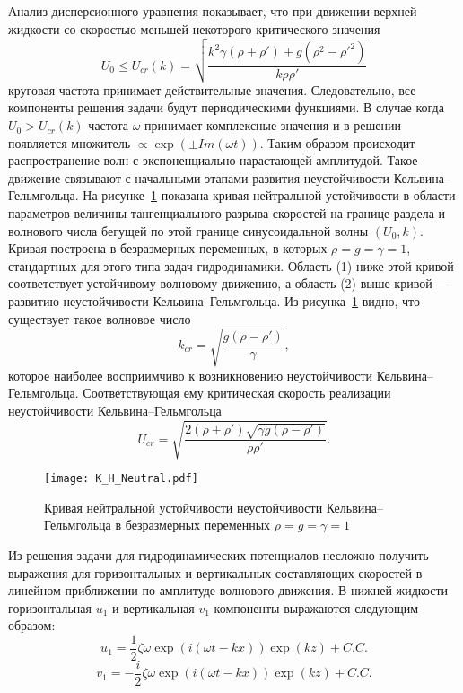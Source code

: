 Анализ дисперсионного уравнения показывает, что при движении верхней жидкости со скоростью меньшей некоторого критического значения \[U_{0}\leq U_{cr}\left( k \right)=\sqrt{\dfrac{k^{2} \gamma \left( \rho+\rho' \right) +g \left( \rho^{2}-\rho'^{2} \right)}{k \rho \rho'}}\] круговая частота  принимает действительные значения. Следовательно, все компоненты решения задачи будут периодическими функциями. В случае когда $ U_{0}>U_{cr}\left( k \right) $ частота $ \omega $ принимает комплексные значения и в решении появляется множитель $ \propto\exp \left( \pm Im\left( \omega t \right) \right) $. Таким образом происходит распространение волн с экспоненциально нарастающей амплитудой. Такое движение связывают с начальными этапами развития неустойчивости Кельвина--Гельмгольца. На рисунке~\ref{fig:K_H_Neutral} показана кривая нейтральной устойчивости в области параметров величины тангенциального разрыва скоростей на границе раздела и волнового числа бегущей по этой границе синусоидальной волны $ \left( U_{0}, k \right) $. Кривая построена в безразмерных переменных, в которых $ \rho=g=\gamma=1 $, стандартных для этого типа задач гидродинамики. Область (1) ниже этой кривой соответствует устойчивому волновому движению, а область (2) выше кривой --- развитию неустойчивости Кельвина--Гельмгольца. Из рисунка~\ref{fig:K_H_Neutral} видно, что существует такое волновое число \[k_{cr}=\sqrt{\dfrac{g \left( \rho - \rho' \right)}{\gamma}},\] которое наиболее восприимчиво к возникновению неустойчивости Кельвина--Гельмгольца. Соответствующая ему критическая скорость реализации неустойчивости Кельвина--Гельмгольца
\begin{equation}
U_{cr}=\sqrt{\dfrac{2 \left( \rho + \rho' \right) \sqrt{\gamma g \left( \rho - \rho' \right)}}{\rho \rho'}}.
\label{Ucrit}
\end{equation}

\begin{figure}[ht]
\centering
\texttt{[image: K\_H\_Neutral.pdf]}
\caption{Кривая нейтральной устойчивости неустойчивости Кельвина--Гельмгольца в безразмерных переменных $ \rho=g=\gamma=1 $}\label{fig:K_H_Neutral}
\end{figure}

Из решения задачи для гидродинамических потенциалов несложно получить выражения для горизонтальных и вертикальных составляющих скоростей в линейном приближении по амплитуде волнового движения. В нижней жидкости горизонтальная $ u_{1} $ и вертикальная $ v_{1} $ компоненты выражаются следующим образом:
\begin{equation}
u_{1}=\dfrac{1}{2}\zeta \omega \exp \left( i \left( \omega t -k x\right) \right) \exp \left( k z \right) +C.C.
\label{u1}
\end{equation}
\begin{equation}
v_{1}=-\dfrac{i}{2}\zeta \omega \exp \left( i \left( \omega t -k x\right) \right) \exp \left( k z \right) +C.C.
\label{v1}
\end{equation}

